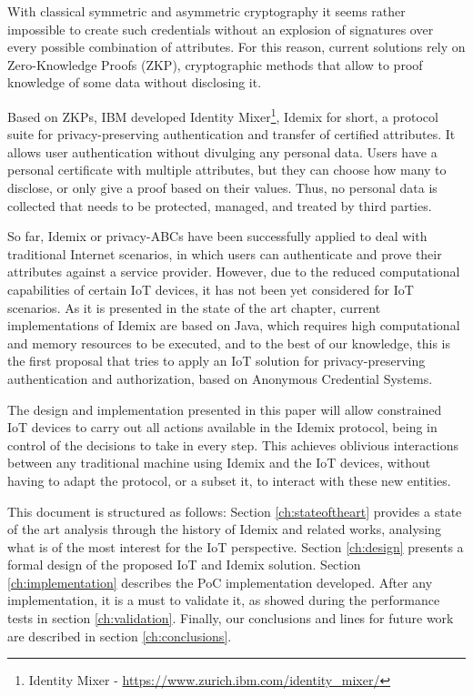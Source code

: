 With classical symmetric and asymmetric cryptography it seems rather impossible to create such credentials without an explosion of signatures over every possible combination of attributes. For this reason, current solutions rely on  Zero-Knowledge Proofs (ZKP), cryptographic methods that allow to proof knowledge of some data without disclosing it.

Based on ZKPs, IBM developed Identity Mixer\footnote{Identity Mixer - \url{https://www.zurich.ibm.com/identity_mixer/}}, %
Idemix for short, a protocol suite for privacy-preserving authentication and transfer of certified attributes. It allows user authentication without divulging any personal data. Users have a personal certificate with multiple attributes, but they can choose how many to disclose, or only give a proof based on their values. Thus, no personal data is collected that needs to be protected, managed, and treated by third parties.

So far, Idemix or privacy-ABCs have been successfully applied to deal with traditional Internet scenarios, in which users can authenticate and prove their attributes against a service provider. However, due to the reduced computational capabilities of certain IoT devices, it has not been yet considered for IoT scenarios. As it is presented in the state of the art chapter, current implementations of Idemix are based on Java, which requires high computational and memory resources to be executed, and to the best of our knowledge, this is the first proposal that tries to apply an IoT solution for privacy-preserving authentication and authorization, based on Anonymous Credential Systems.

The design and implementation presented in this paper will allow constrained IoT devices to carry out all actions available in the Idemix protocol, being in control of the decisions to take in every step. This achieves oblivious interactions between any traditional machine using Idemix and the IoT devices, without having to adapt the protocol, or a subset it, to interact with these new entities.

\hfil

This document is structured as follows: Section \ref{ch:stateoftheart} provides a state of the art analysis through the history of Idemix and related works, analysing what is of the most interest for the IoT perspective. Section \ref{ch:design} presents a formal design of the proposed IoT and Idemix solution. Section \ref{ch:implementation} describes the PoC implementation developed. After any implementation, it is a must to validate it, as showed during the performance tests in section \ref{ch:validation}. Finally, our conclusions and lines for future work are described in section \ref{ch:conclusions}.
